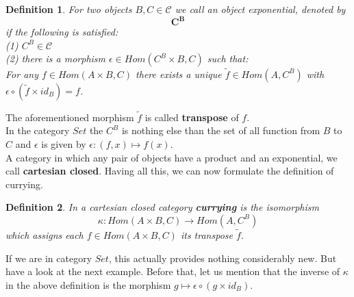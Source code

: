 \documentclass[17pt]{extarticle}
\newtheorem*{definition*}{Definition}
\begin{document}
\begin{definition*}
	For two objects $B, C\in\mathcal{C}$ we call an object exponential, denoted by
	$$\mathbf{C^B}$$
	if the following is satisfied:\\
	(1) $C^B\in\mathcal{C}$\\
	(2) there is a morphism $\epsilon\in Hom(C^B\times B, C)$ such that:\\
	For any $f\in Hom(A\times B, C)$ there exists a unique $\tilde{f}\in Hom(A, C^B)$ with $\epsilon\circ(\tilde{f}\times id_B)=f$.
\end{definition*}
The aforementioned morphism $\tilde{f}$ is called \textbf{transpose} of $f$.\\
In the category $Set$ the $C^B$ is nothing else than the set of all function from $B$ to $C$ and $\epsilon$ is given by $\epsilon:(f, x)\mapsto f(x)$.\\

A category in which any pair of objects have a product and an exponential, we call \textbf{cartesian closed}.
Having all this, we can now formulate the definition of currying.\\
	
\begin{definition*}
	In a cartesian closed category \textbf{currying} is the isomorphism
	\begin{equation*}
		\kappa:Hom(A\times B, C)\rightarrow Hom(A, C^B)
	\end{equation*}
	which assigns each $f\in Hom(A\times B, C)$ its transpose $\tilde{f}$.
\end{definition*}

If we are in category $Set$, this actually provides nothing considerably new. But have a look at the next example. Before that, let us mention that the inverse of $\kappa$ in the above definition is the morphism $g\mapsto\epsilon\circ(g\times id_B)$.\\
\end{document}
